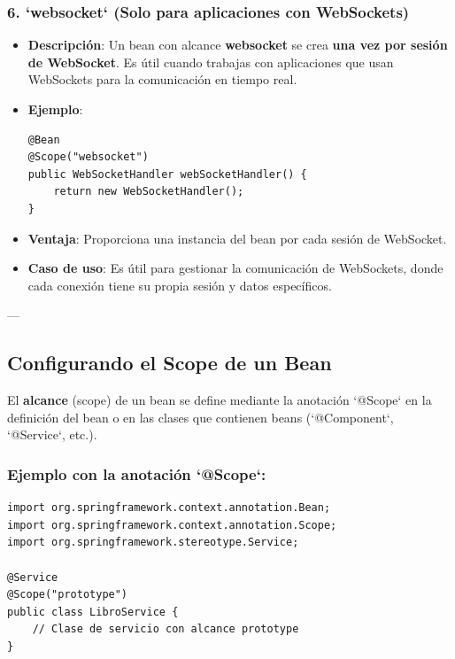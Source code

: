 \documentclass[11pt]{article}
\begin{document}
\subsubsection{6. \textbf{\textbf{`websocket`}} (Solo para aplicaciones con WebSockets)}
\label{sec:org95f33ae}
\begin{itemize}
\item \textbf{\textbf{Descripción}}: Un bean con alcance \textbf{\textbf{websocket}} se crea \textbf{\textbf{una vez por sesión de WebSocket}}. Es útil cuando trabajas con aplicaciones que usan WebSockets para la comunicación en tiempo real.

\item \textbf{\textbf{Ejemplo}}:
\begin{verbatim}
@Bean
@Scope("websocket")
public WebSocketHandler webSocketHandler() {
    return new WebSocketHandler();
}
\end{verbatim}

\item \textbf{\textbf{Ventaja}}: Proporciona una instancia del bean por cada sesión de WebSocket.
\item \textbf{\textbf{Caso de uso}}: Es útil para gestionar la comunicación de WebSockets, donde cada conexión tiene su propia sesión y datos específicos.
\end{itemize}

---

\subsection{Configurando el Scope de un Bean}
\label{sec:orgbdedc8b}
El \textbf{\textbf{alcance}} (scope) de un bean se define mediante la anotación `@Scope` en la definición del bean o en las clases que contienen beans (`@Component`, `@Service`, etc.).

\subsubsection{Ejemplo con la anotación `@Scope`:}
\label{sec:org560040b}
\begin{verbatim}
import org.springframework.context.annotation.Bean;
import org.springframework.context.annotation.Scope;
import org.springframework.stereotype.Service;

@Service
@Scope("prototype")
public class LibroService {
    // Clase de servicio con alcance prototype
}
\end{verbatim}
\end{document}
